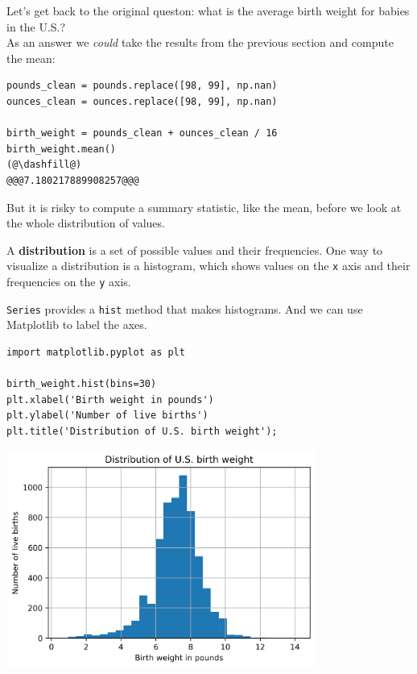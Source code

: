 Let's get back to the original queston: what is the average birth weight
for babies in the U.S.?\\
As an answer we \emph{could} take the results from the previous section
and compute the mean:

\begin{lstlisting}[]
pounds_clean = pounds.replace([98, 99], np.nan)
ounces_clean = ounces.replace([98, 99], np.nan)

birth_weight = pounds_clean + ounces_clean / 16
birth_weight.mean()
(@\dashfill@)
@@@7.180217889908257@@@
\end{lstlisting}

But it is risky to compute a summary statistic, like the mean, before we
look at the whole distribution of values.

A \textbf{distribution} is a set of possible values and their
frequencies. One way to visualize a distribution is a histogram, which
shows values on the \passthrough{\lstinline!x!} axis and their
frequencies on the \passthrough{\lstinline!y!} axis.

\passthrough{\lstinline!Series!} provides a
\passthrough{\lstinline!hist!} method that makes histograms. And we can
use Matplotlib to label the axes.

\begin{lstlisting}[]
import matplotlib.pyplot as plt

birth_weight.hist(bins=30)
plt.xlabel('Birth weight in pounds')
plt.ylabel('Number of live births')
plt.title('Distribution of U.S. birth weight');
\end{lstlisting}

\begin{center}
\includegraphics[width=4in]{chapters/07_dataframes_files/07_dataframes_59_0.png}
\end{center}

